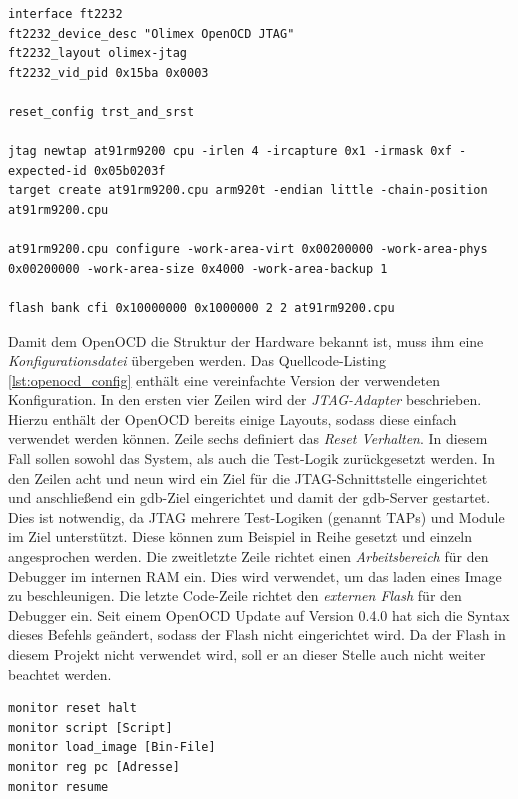 \documentclass[
  a4paper,					%
  twoside,
  DIV=calc,     				%
  bibliography=totoc,
  cleardoublepage=empty,
  ngerman,     					%
  final       					%
]{scrbook}
\begin{document}
\begin{lstlisting}[frame=single, float, caption={OpenOCD Konfiguration}, label={lst:openocd_config}]
interface ft2232
ft2232_device_desc "Olimex OpenOCD JTAG"
ft2232_layout olimex-jtag
ft2232_vid_pid 0x15ba 0x0003

reset_config trst_and_srst

jtag newtap at91rm9200 cpu -irlen 4 -ircapture 0x1 -irmask 0xf -expected-id 0x05b0203f
target create at91rm9200.cpu arm920t -endian little -chain-position at91rm9200.cpu

at91rm9200.cpu configure -work-area-virt 0x00200000 -work-area-phys 0x00200000 -work-area-size 0x4000 -work-area-backup 1

flash bank cfi 0x10000000 0x1000000 2 2 at91rm9200.cpu
\end{lstlisting}

Damit dem OpenOCD die Struktur der Hardware bekannt ist, muss ihm eine \emph{Konfigurationsdatei} übergeben werden. Das Quellcode-Listing \ref{lst:openocd_config} enthält eine vereinfachte Version der verwendeten Konfiguration. In den ersten vier Zeilen wird der \emph{JTAG-Adapter} beschrieben. Hierzu enthält der OpenOCD bereits einige Layouts, sodass diese einfach verwendet werden können. Zeile sechs definiert das \emph{Reset Verhalten}. In diesem Fall sollen sowohl das System, als auch die Test-Logik zurückgesetzt werden. In den Zeilen acht und neun wird ein Ziel für die JTAG-Schnittstelle eingerichtet und anschließend ein gdb-Ziel eingerichtet und damit der gdb-Server gestartet. Dies ist notwendig, da JTAG mehrere Test-Logiken (genannt TAPs) und Module im Ziel unterstützt. Diese können zum Beispiel in Reihe gesetzt und einzeln angesprochen werden. Die zweitletzte Zeile richtet einen \emph{Arbeitsbereich} für den Debugger im internen RAM ein. Dies wird verwendet, um das laden eines Image zu beschleunigen. Die letzte Code-Zeile richtet den \emph{externen Flash} für den Debugger ein. Seit einem OpenOCD Update auf Version 0.4.0 hat sich die Syntax dieses Befehls geändert, sodass der Flash nicht eingerichtet wird. Da der Flash in diesem Projekt nicht verwendet wird, soll er an dieser Stelle auch nicht weiter beachtet werden.

\begin{lstlisting}[frame=single, float, caption={OpenOCD Kommandos zum starten eines Programms}, label={lst:openocd_startup}]
monitor reset halt
monitor script [Script]
monitor load_image [Bin-File]
monitor reg pc [Adresse]
monitor resume
\end{lstlisting}
\end{document}
